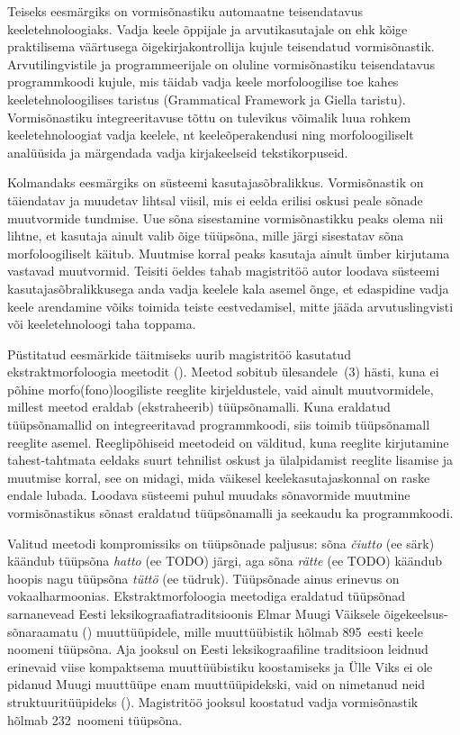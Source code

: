 \documentclass[12pt,a4paper]{article}
\newcommand{\vadja}[1]{\textit{#1}}
\begin{document}
Teiseks eesmärgiks on vormisõnastiku automaatne teisendatavus keele\-tehnoloogiaks. Vadja keele õppijale ja arvuti\-kasutajale on ehk kõige praktilisema väärtusega õigekirja\-kontrollija kujule teisendatud vormi\-sõnastik. Arvuti\-lingvistile ja programmeerijale on oluline vormi\-sõnastiku teisendatavus programm\-koodi kujule, mis täidab vadja keele morfoloogilise toe kahes keele\-tehnoloogilises taristus (Grammatical Framework ja Giella taristu). Vormi\-sõnastiku integreeritavuse tõttu on tulevikus võimalik luua rohkem keeletehnoloogiat vadja keelele, nt keeleõpe\-rakendusi ning morfoloogiliselt analüüsida ja märgendada vadja kirja\-keelseid teksti\-korpuseid.

Kolmandaks eesmärgiks on süsteemi kasutaja\-sõbralikkus. Vormi\-sõnastik on täiendatav ja muudetav lihtsal viisil, mis ei eelda erilisi oskusi peale sõnade muut\-vormide tundmise. Uue sõna sisestamine vormi\-sõnastikku peaks olema nii lihtne, et kasutaja ainult valib õige tüüpsõna, mille järgi sisestatav sõna morfoloogiliselt käitub. Muutmise korral peaks kasutaja ainult ümber kirjutama vastavad muut\-vormid. Teisiti öeldes tahab magistritöö autor loodava süsteemi kasutaja\-sõbralikkusega anda vadja keelele kala asemel õnge,
et edaspidine vadja keele arendamine võiks toimida teiste eest\-vedamisel, mitte jääda arvutus\-lingvisti või keele\-tehnoloogi taha toppama.

Püstitatud eesmärkide täitmiseks uurib magistritöö kasutatud ekstrakt\-morfoloogia meetodit (\cite{ahlberg_semi-supervised_2014}). Meetod sobitub ülesandele~(3) hästi, kuna ei põhine morfo(fono)loogiliste reeglite kirjeldustele, vaid ainult muut\-vormidele, millest meetod eraldab (ekstraheerib) tüüpsõna\-malli. Kuna eraldatud tüüpsõna\-mallid on integreeritavad programm\-koodi, siis toimib tüüp\-sõna\-mall reeglite asemel. %
Reegli\-põhiseid meetodeid on välditud, kuna reeglite kirjutamine tahest-tahtmata eeldaks suurt tehnilist oskust ja ülalpidamist reeglite lisamise ja muutmise korral, see on midagi, mida väikesel keele\-kasutajas\-konnal on raske endale lubada. Loodava süsteemi puhul muudaks sõnavormide muutmine vormisõnastikus sõnast eraldatud tüüpsõna\-malli ja seekaudu ka programm\-koodi.


Valitud meetodi kompromissiks on tüüpsõnade paljusus: sõna \vadja{čiutto} (ee särk) käändub tüüpsõna \vadja{hatto} (ee TODO) järgi, aga sõna \vadja{rätte} (ee TODO) käändub hoopis nagu tüüpsõna \vadja{tüttö} (ee tüdruk). Tüüp\-sõnade ainus erinevus on vokaalharmoonias. Ekstrakt\-morfoloogia meetodiga eraldatud tüüpsõnad sarnanevead Eesti leksikograafia\-traditsioonis Elmar Muugi Väiksele õigekeelsus-sõnaraamatu (\citeyear{muuk_vaike_1933}) muuttüüpidele, mille muuttüübistik hõlmab 895~eesti keele noomeni tüüpsõna. Aja jooksul on Eesti leksikograafiline traditsioon leidnud erinevaid viise kompaktsema muuttüübistiku koostamiseks ja Ülle Viks ei ole pidanud Muugi muuttüüpe enam muuttüüpidekski, vaid on nimetanud neid struktuuri\-tüüpideks (\cite[282]{viks_verbide_1976}). Magistritöö jooksul koostatud vadja vormisõnastik hõlmab 232~noomeni tüüpsõna. %
\end{document}
